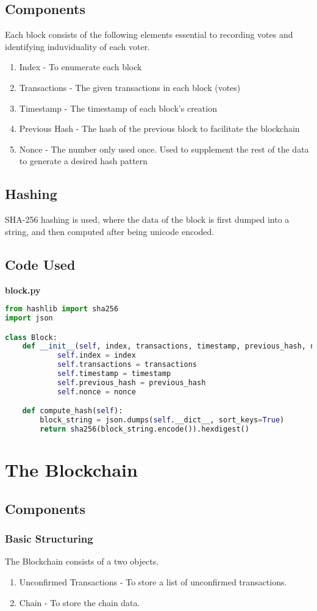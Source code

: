 \documentclass{article}
\begin{document}
	\subsection{Components}
	Each block consists of the following elements essential to recording votes and identifying induviduality of each voter.
	\begin{enumerate}
		\item Index - To enumerate each block
		\item Transactions - The given transactions in each block (votes)
		\item Timestamp - The timestamp of each block's creation
		\item Previous Hash - The hash of the previous block to facilitate the blockchain
		\item Nonce - The number only used once. Used to supplement the rest of the data to generate a desired hash pattern
	\end{enumerate}
	\subsection{Hashing}
	SHA-256 hashing is used, where the data of the block is first dumped into a string, and then computed after being unicode encoded.
	\subsection{Code Used}
	\textbf{block.py}
	\begin{lstlisting}[language=Python]
from hashlib import sha256
import json

class Block:
	def __init__(self, index, transactions, timestamp, previous_hash, nonce=0):
			self.index = index
			self.transactions = transactions
			self.timestamp = timestamp
			self.previous_hash = previous_hash
			self.nonce = nonce

	def compute_hash(self):
		block_string = json.dumps(self.__dict__, sort_keys=True)
		return sha256(block_string.encode()).hexdigest()
	\end{lstlisting}
\pagebreak
\section{The Blockchain}
\subsection{Components}
\subsubsection{Basic Structuring}
The Blockchain consists of a two objects. 
\begin{enumerate}
	\item Unconfirmed Transactions - To store a list of unconfirmed transactions.
	\item Chain - To store the chain data.
\end{enumerate}
\end{document}

